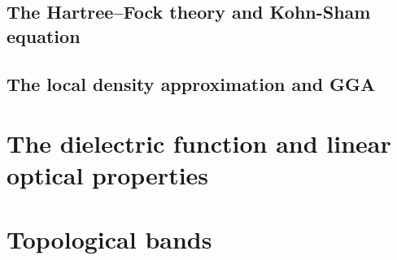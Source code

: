 \subsection{The Hartree–Fock theory and Kohn-Sham equation}

\subsection{The local density approximation and GGA}

\newpage
\section{The dielectric function and linear optical properties}

\newpage
\section{Topological bands}
